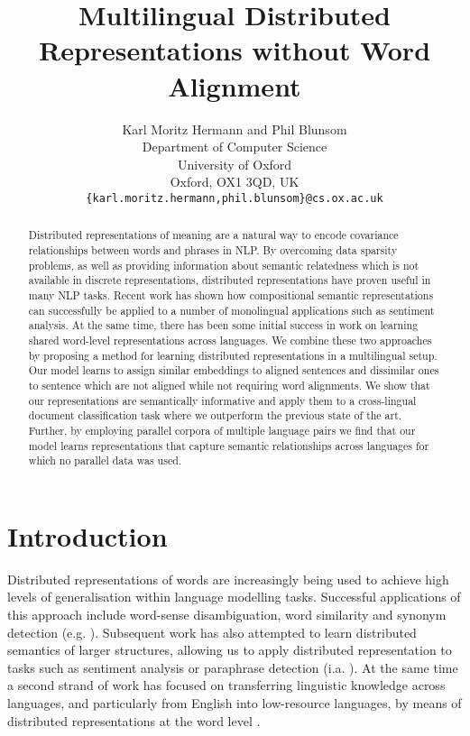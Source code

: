 \documentclass{article} \pdfoutput=1
\title{Multilingual Distributed Representations without Word Alignment}
\author{Karl Moritz Hermann and Phil Blunsom\\
 Department of Computer Science\\
 University of Oxford\\
 Oxford, OX1 3QD, UK\\
 {\tt \{karl.moritz.hermann,phil.blunsom\}@cs.ox.ac.uk}}
\date{}
\begin{document}
\maketitle
\begin{abstract}
Distributed representations of meaning are a natural way to encode covariance
relationships between words and phrases in NLP.  By overcoming data sparsity
problems, as well as providing information about semantic relatedness which is
not available in discrete representations, distributed representations have
proven useful in many NLP tasks. Recent work has shown how compositional
semantic representations can successfully be applied to a number of monolingual
applications such as sentiment analysis.  At the same time, there has been some
initial success in work on learning shared word-level representations across
languages.  We combine these two approaches by proposing a method for learning
distributed representations in a multilingual setup.  Our model learns to assign
similar embeddings to aligned sentences and dissimilar ones to sentence which
are not aligned while not requiring word alignments.  We show that our
representations are semantically informative and apply them to a cross-lingual
document classification task where we outperform the previous state of the art.
Further, by employing parallel corpora of multiple language pairs we find that
our model learns representations that capture semantic relationships across
languages for which no parallel data was used.
\end{abstract}

\section{Introduction}

Distributed representations of words are increasingly being used to achieve high levels of generalisation within language modelling tasks.
Successful applications of this approach include word-sense disambiguation, word similarity and synonym detection (e.g. \cite{Erk:2008,Turney:2010}).
Subsequent work has also attempted to learn distributed semantics of larger structures, allowing us to apply distributed representation to tasks such as sentiment analysis or paraphrase detection (i.a. \cite{Baroni:2010,Clark:2007a,Grefenstette:2011,Hermann:2013:ACL,Mitchell:2008,Socher:2012}).
At the same time a second strand of work has focused on transferring linguistic knowledge across languages, and particularly from English into low-resource languages, by means of distributed representations at the word level \cite{Haghighi:2008,Klementiev:2012}.
\end{document}
